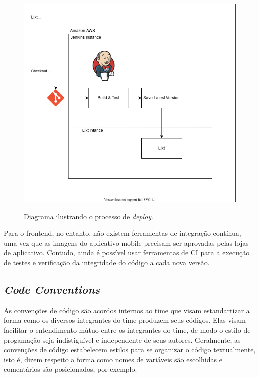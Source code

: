\begin{figure}
  \centering
  \caption{Diagrama ilustrando o processo de \emph{deploy}.}
  \includegraphics[scale=0.50]{images/deploy}
  \label{fig:jenkins}
\end{figure}

Para o \gls{frontend}, no entanto, não existem ferramentas de
integração contínua, uma vez que as imagens do aplicativo mobile
precisam ser aprovadas pelas lojas de aplicativo. Contudo, ainda é
possível usar ferramentas de CI para a execução de testes e
verificação da integridade do código a cada nova versão.

\subsection{\emph{Code Conventions}}

As convenções de código são acordos internos ao time que visam
estandartizar a forma como os diversos integrantes do time produzem
seus códigos.  Elas visam facilitar o entendimento mútuo entre os
integrantes do time, de modo o estilo de progamação seja indistiguível
e independente de seus autores.  Geralmente, as convenções de código
estabelecem estilos para se organizar o código textualmente, isto é,
dizem respeito a forma como nomes de variáveis são escolhidas e
comentários são posicionados, por exemplo.

